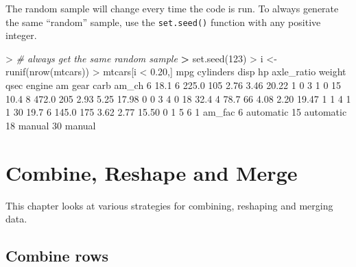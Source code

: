 \documentclass[
]{book}
\newenvironment{Shaded}{\begin{snugshade}}{\end{snugshade}}
\newcommand{\CommentTok}[1]{\textcolor[rgb]{0.56,0.35,0.01}{\textit{#1}}}
\newcommand{\DecValTok}[1]{\textcolor[rgb]{0.00,0.00,0.81}{#1}}
\newcommand{\ErrorTok}[1]{\textcolor[rgb]{0.64,0.00,0.00}{\textbf{#1}}}
\newcommand{\FloatTok}[1]{\textcolor[rgb]{0.00,0.00,0.81}{#1}}
\newcommand{\FunctionTok}[1]{\textcolor[rgb]{0.00,0.00,0.00}{#1}}
\newcommand{\NormalTok}[1]{#1}
\newcommand{\OtherTok}[1]{\textcolor[rgb]{0.56,0.35,0.01}{#1}}
\newcommand{\SpecialCharTok}[1]{\textcolor[rgb]{0.00,0.00,0.00}{#1}}
\begin{document}
The random sample will change every time the code is run. To always generate the same ``random'' sample, use the \texttt{set.seed()} function with any positive integer.

\begin{Shaded}
\begin{Highlighting}[]
\SpecialCharTok{\textgreater{}} \CommentTok{\# always get the same random sample}
\ErrorTok{\textgreater{}} \FunctionTok{set.seed}\NormalTok{(}\DecValTok{123}\NormalTok{)}
\SpecialCharTok{\textgreater{}}\NormalTok{ i }\OtherTok{\textless{}{-}} \FunctionTok{runif}\NormalTok{(}\FunctionTok{nrow}\NormalTok{(mtcars))}
\SpecialCharTok{\textgreater{}}\NormalTok{ mtcars[i }\SpecialCharTok{\textless{}} \FloatTok{0.20}\NormalTok{,]}
\NormalTok{    mpg cylinders  disp  hp axle\_ratio weight  qsec engine am gear carb am\_ch}
\DecValTok{6}  \FloatTok{18.1}         \DecValTok{6} \FloatTok{225.0} \DecValTok{105}       \FloatTok{2.76}   \FloatTok{3.46} \FloatTok{20.22}      \DecValTok{1}  \DecValTok{0}    \DecValTok{3}    \DecValTok{1}     \DecValTok{0}
\DecValTok{15} \FloatTok{10.4}         \DecValTok{8} \FloatTok{472.0} \DecValTok{205}       \FloatTok{2.93}   \FloatTok{5.25} \FloatTok{17.98}      \DecValTok{0}  \DecValTok{0}    \DecValTok{3}    \DecValTok{4}     \DecValTok{0}
\DecValTok{18} \FloatTok{32.4}         \DecValTok{4}  \FloatTok{78.7}  \DecValTok{66}       \FloatTok{4.08}   \FloatTok{2.20} \FloatTok{19.47}      \DecValTok{1}  \DecValTok{1}    \DecValTok{4}    \DecValTok{1}     \DecValTok{1}
\DecValTok{30} \FloatTok{19.7}         \DecValTok{6} \FloatTok{145.0} \DecValTok{175}       \FloatTok{3.62}   \FloatTok{2.77} \FloatTok{15.50}      \DecValTok{0}  \DecValTok{1}    \DecValTok{5}    \DecValTok{6}     \DecValTok{1}
\NormalTok{      am\_fac}
\DecValTok{6}\NormalTok{  automatic}
\DecValTok{15}\NormalTok{ automatic}
\DecValTok{18}\NormalTok{    manual}
\DecValTok{30}\NormalTok{    manual}
\end{Highlighting}
\end{Shaded}

\hypertarget{combine-reshape-and-merge}{%
\chapter{Combine, Reshape and Merge}\label{combine-reshape-and-merge}}

This chapter looks at various strategies for combining, reshaping and merging data.

\hypertarget{combine-rows}{%
\section{Combine rows}\label{combine-rows}}
\end{document}
